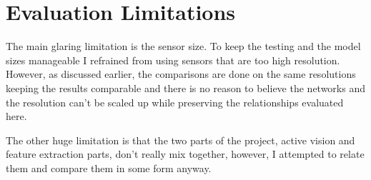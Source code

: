 \section{Evaluation Limitations}
The main glaring limitation is the sensor size. To keep the testing and the model sizes manageable I refrained from using sensors that are too high resolution. However, as discussed earlier, the comparisons are done on the same resolutions keeping the results comparable and there is no reason to believe the networks and the resolution can't be scaled up while preserving the relationships evaluated here.

The other huge limitation is that the two parts of the project, active vision and feature extraction parts, don't really mix together, however, I attempted to relate them and compare them in some form anyway.


